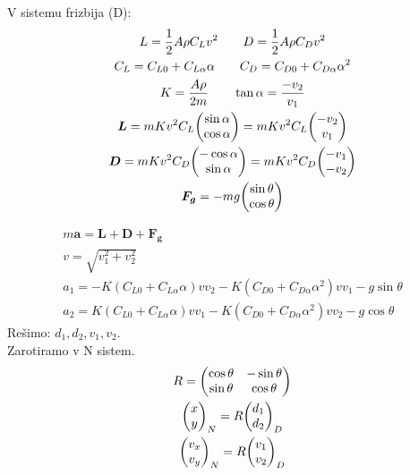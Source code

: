 \documentclass{beamer}
\begin{document}

\begin{frame}
V sistemu frizbija (D):
\begin{gather}
L = \dfrac{1}{2} A \rho C_L v^2 \qquad D = \dfrac{1}{2} A \rho C_D v^2\\
C_L = C_{L0} + C_{L \alpha} \alpha \qquad C_D = C_{D0} + C_{D \alpha} \alpha^2\\
K = \dfrac{A \rho}{2 m} \qquad \tan \alpha = \dfrac{-v_2}{v_1}\\
\bm L = m K v^2 C_L \mqty(\sin \alpha \\ \cos \alpha) = m K v^2 C_L \mqty(-v_2 \\ v_1\\)\\
\bm D = m K v^2 C_D \mqty(-\cos \alpha \\ \sin \alpha) = m K v^2 C_D \mqty(-v_1 \\ -v_2\\)\\
\bm F_{\bm g} = - m g  \mqty(\sin \theta \\ \cos \theta)
\end{gather}
\end{frame}


\begin{frame}
\begin{gather}
m \bm a = \bm L + \bm D + \bm F_{\bm g}\\
v = \sqrt{v_1^2 + v_2^2}\\
a_1 = -K (C_{L0} + C_{L \alpha} \alpha) v v_2 - K (C_{D0} + C_{D \alpha} \alpha^2) v v_1 - g \sin \theta\\
a_2 = K (C_{L0} + C_{L \alpha} \alpha) v v_1 - K (C_{D0} + C_{D \alpha} \alpha^2) v v_2 - g \cos\theta
\end{gather}
Rešimo: \(d_1, d_2, v_1, v_2 \).\\
Zarotiramo v N sistem.
\begin{gather}
R = \mqty(\cos \theta & -\sin \theta \\ \sin \theta & \cos \theta)\\
\mqty(x \\ y)_N = R \mqty(d_1 \\ d_2)_D\\
\mqty(v_x \\ v_y)_N = R \mqty(v_1 \\ v_2)_D
\end{gather}
\end{frame}
\end{document}

